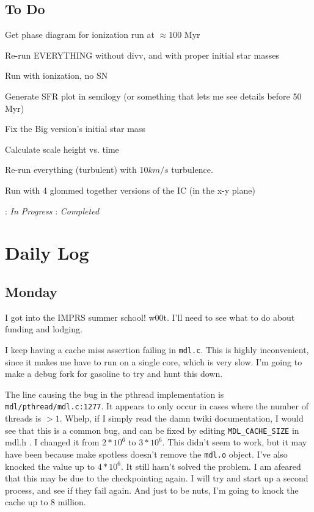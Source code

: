 \documentclass[11pt,letterpaper]{article}
\begin{document}
\subsection*{To Do}
\begin{bullets} 
\item \checkmark Get phase diagram for ionization run at $\approx 100$ Myr
\item \checkmark Re-run EVERYTHING without divv, and with proper initial star masses
\item \checkmark Run with ionization, no SN
\item \checkmark Generate SFR plot in semilogy (or something that lets me see 
details before 50 Myr)
\item \textleaf Fix the Big version's initial star mass
\item \checkmark Calculate scale height vs. time
\item \textleaf Re-run everything (turbulent) with $10km/s$ turbulence.
\item \textleaf Run with 4 glommed together versions of the IC (in the x-y plane)
\end{bullets}

\textleaf : \textit{In Progress} \qquad \checkmark : \textit{Completed}

\section*{Daily Log}
\subsection*{Monday}
I got into the IMPRS summer school!  w00t.  I'll need to see what to do about
funding and lodging.

I keep having a cache miss assertion failing in \verb!mdl.c!.  This is highly
inconvenient, since it makes me have to run on a single core, which is very 
slow.  I'm going to make a debug fork for gasoline to try and hunt this down.

The line causing the bug in the pthread implementation is 
\verb!mdl/pthread/mdl.c:1277!.  It appears to only occur in cases where the 
number of threads is $>1$.  Whelp, if I simply read the damn twiki 
documentation, I would see that this is a common bug, and can be fixed by
editing \verb!MDL_CACHE_SIZE! in mdl.h . I changed it from $2*10^6$ to $3*10^6$.
This didn't seem to work, but it may have been because make spotless doesn't 
remove the \verb!mdl.o! object.  I've also knocked the value up to $4*10^6$.
It still hasn't solved the problem.  I am afeared that this may be due to
the checkpointing again.  I will try and start up a second process, and see
if they fail again.  And just to be nuts, I'm going to knock the cache up to 8
million.
\end{document}
